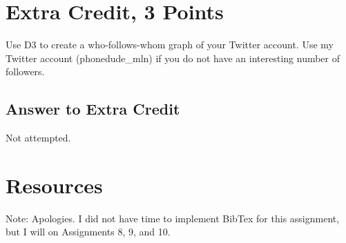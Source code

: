 \documentclass{article}
\begin{document}
\newpage

\section*{Extra Credit, 3 Points}

Use D3 to create a who-follows-whom graph of your Twitter account. Use my Twitter account (phonedude\_mln) if you do not have an interesting number of followers.


\subsection*{Answer to Extra Credit}

Not attempted.



\newpage

\section*{Resources}

Note: Apologies. I did not have time to implement BibTex for this assignment, but I will on Assignments 8, 9, and 10.
\end{document}
